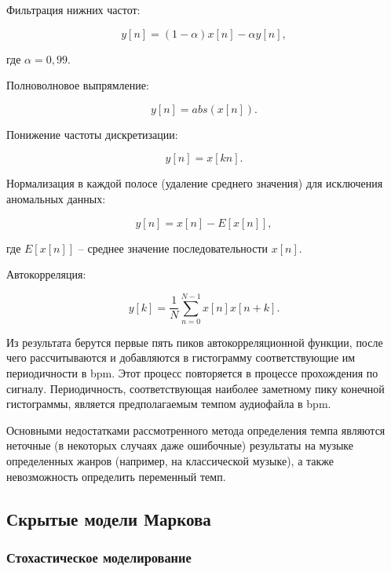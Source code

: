 Фильтрация нижних частот:

\begin{equation}
	y[n] = (1 - \alpha)x[n] - \alpha y[n],
\end{equation}

где $\alpha = 0,99$.

\newpage

Полноволновое выпрямление:

\begin{equation}
	y[n] = abs(x[n]).
\end{equation}

Понижение частоты дискретизации:

\begin{equation}
	y[n] = x[kn].
\end{equation}

Нормализация в каждой полосе (удаление среднего значения) для исключения аномальных данных:

\begin{equation}
	y[n] = x[n] - E[x[n]],
\end{equation}

где $E[x[n]]$ -- среднее значение последовательности $x[n]$.

Автокорреляция:

\begin{equation}
	y[k] = \frac{1}{N} \sum_{n=0}^{N-1}x[n]x[n+k].
\end{equation}

Из результата берутся первые пять пиков автокорреляционной функции, после чего рассчитываются и добавляются в гистограмму соответствующие им периодичности в bpm. Этот процесс повторяется в процессе прохождения по сигналу. Периодичность, соответствующая наиболее заметному пику конечной гистограммы, является предполагаемым темпом аудиофайла в bpm.

Основными недостатками рассмотренного метода определения темпа являются неточные (в некоторых случаях даже ошибочные) результаты на музыке определенных жанров (например, на классической музыке), а также невозможность определить переменный темп.

\subsection{Скрытые модели Маркова}

\subsubsection{Стохастическое моделирование}


